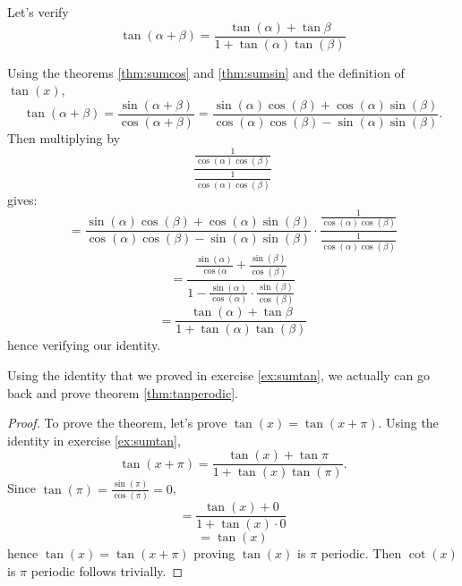 \begin{ex}
	Let's verify
	$$\tan(\alpha+\beta)=\frac{\tan(\alpha)+\tan{\beta}}{1+\tan(\alpha)\tan(\beta)}$$

	Using the theorems \eqref{thm:sumcos} and \eqref{thm:sumsin} and the definition of $\tan(x)$,
	$$\tan(\alpha+\beta)=\frac{\sin(\alpha+\beta)}{\cos(\alpha+\beta)}
	=\frac{\sin(\alpha)\cos(\beta)+\cos(\alpha)\sin(\beta)}
	{\cos(\alpha)\cos(\beta)-\sin(\alpha)\sin(\beta)}.$$
	Then multiplying by
	$$\frac{\frac{1}{\cos(\alpha)\cos(\beta)}}{\frac{1}{\cos(\alpha)\cos(\beta)}}$$
	gives:
	$$=\frac{\sin(\alpha)\cos(\beta)+\cos(\alpha)\sin(\beta)}
	{\cos(\alpha)\cos(\beta)-\sin(\alpha)\sin(\beta)}\cdot
	\frac{\frac{1}{\cos(\alpha)\cos(\beta)}}{\frac{1}{\cos(\alpha)\cos(\beta)}}$$
	$$=\frac{\frac{\sin(\alpha)}{\cos(\alpha}+\frac{\sin(\beta)}{\cos(\beta)}}
	{1-\frac{\sin(\alpha)}{\cos(\alpha)}\cdot\frac{\sin(\beta)}{\cos(\beta)}}$$
	$$=\frac{\tan(\alpha)+\tan{\beta}}{1+\tan(\alpha)\tan(\beta)}$$
	hence verifying our identity.
	\label{ex:sumtan}
\end{ex}

Using the identity that we proved in exercise \eqref{ex:sumtan}, we actually can go back and prove theorem \eqref{thm:tanperodic}.
\begin{proof}
	To prove the theorem, let's prove $\tan(x)=\tan(x+\pi)$.
	Using the identity in exercise \eqref{ex:sumtan},
	$$\tan(x+\pi)=
	\frac{\tan(x)+\tan{\pi}}{1+\tan(x)\tan(\pi)}.$$
	Since $\tan(\pi)=\frac{\sin(\pi)}{\cos(\pi)}=0$,
	$$=\frac{\tan(x)+0}{1+\tan(x)\cdot 0}$$
	$$=\tan(x)$$
	hence $\tan(x)=\tan(x+\pi)$ proving $\tan(x)$ is $\pi$ periodic. Then $\cot(x)$ is $\pi$ periodic follows trivially.
\end{proof}










